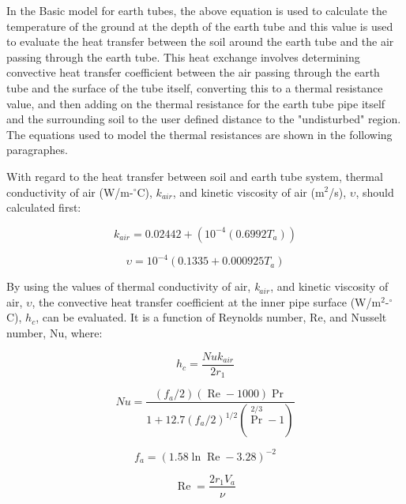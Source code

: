 In the Basic model for earth tubes, the above equation is used to calculate the temperature of the ground at the depth of the earth tube and this value is used to evaluate the heat transfer between the soil around the earth tube and the air passing through the earth tube.  This heat exchange involves determining convective heat transfer coefficient between the air passing through the earth tube and the surface of the tube itself, converting this to a thermal resistance value, and then adding on the thermal resistance for the earth tube pipe itself and the surrounding soil to the user defined distance to the "undisturbed" region.  The equations used to model the thermal resistances are shown in the following paragraphes.

With regard to the heat transfer between soil and earth tube system, thermal conductivity of air (W/m-\(^{\circ}\)C), \(k_{air}\), and kinetic viscosity of air (m\(^{2}\)/s), \({\upsilon}\), should calculated first:

\begin{equation}
{k_{air}} = 0.02442 + ({10^{ - 4}}(0.6992{T_a}))
\end{equation}

\begin{equation}
\upsilon  = {10^{ - 4}}(0.1335 + 0.000925{T_a})
\end{equation}

By using the values of thermal conductivity of air, \emph{k\(_{air}\)}, and kinetic viscosity of air, \({\upsilon}\), the convective heat transfer coefficient at the inner pipe surface (W/m\(^{2}\)-\(^{\circ}\)C), \({h_c}\), can be evaluated. It is a function of Reynolds number, Re, and Nusselt number, Nu, where:

\begin{equation}
{h_c} = \frac{{Nu{k_{air}}}}{{2{r_1}}}
\end{equation}

\begin{equation}
Nu = \frac{{({f_a}/2)(\operatorname{Re}  - 1000)\Pr }}{{1 + 12.7{{({f_a}/2)}^{1/2}}({{\Pr }^{2/3}} - 1)}}
\end{equation}

\begin{equation}
{f_a} = {(1.58\ln \operatorname{Re}  - 3.28)^{ - 2}}
\end{equation}

\begin{equation}
  \mathop\mathrm{Re}\nolimits  = \frac{{2{r_1}{V_a}}}{\nu }
\end{equation}

